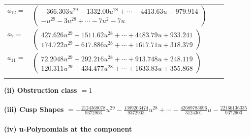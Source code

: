 \documentclass[1p]{elsarticle_modified}
\theoremstyle{definition}
\begin{document}
\begin{tabular}{m{7pt} m{180pt} m{7pt} m{180pt} }
\flushright $a_{12}=$&$\begin{pmatrix}-366.303 u^{29}-1332.00 u^{28}+\cdots-4413.63 u-979.914\\- u^{29}-3 u^{28}+\cdots-7 u^2-7 u\end{pmatrix}$ \\
\flushright $a_{7}=$&$\begin{pmatrix}427.626 u^{29}+1511.62 u^{28}+\cdots+4483.79 u+933.241\\174.722 u^{29}+617.886 u^{28}+\cdots+1617.71 u+318.379\end{pmatrix}$ \\
\flushright $a_{11}=$&$\begin{pmatrix}72.2048 u^{29}+292.216 u^{28}+\cdots+913.748 u+248.119\\120.311 u^{29}+434.477 u^{28}+\cdots+1633.83 u+355.868\end{pmatrix}$\\&\end{tabular}
\flushleft \textbf{(ii) Obstruction class $= 1$}\\~\\
\flushleft \textbf{(iii) Cusp Shapes $= -\frac{2124368078}{9372903} u^{29}-\frac{1389203474}{9372903} u^{28}+\cdots-\frac{42689783696}{3124301} u-\frac{22166136335}{9372903}$}\\~\\
\newpage\renewcommand{\arraystretch}{1}
\flushleft \textbf{(iv) u-Polynomials at the component}\newline \\
\end{document}
